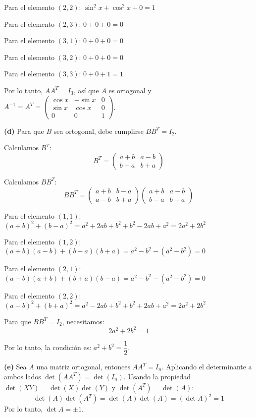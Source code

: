 \begin{myproof}
Para el elemento $(2,2)$: $\sin^2 x + \cos^2 x + 0 = 1$

Para el elemento $(2,3)$: $0 + 0 + 0 = 0$

Para el elemento $(3,1)$: $0 + 0 + 0 = 0$

Para el elemento $(3,2)$: $0 + 0 + 0 = 0$

Para el elemento $(3,3)$: $0 + 0 + 1 = 1$

Por lo tanto, $AA^T = I_3$, así que $A$ es ortogonal y $A^{-1} = A^T = \left(\begin{array}{ccc}\cos x & -\sin x & 0 \\\sin x & \cos x & 0 \\0 & 0 & 1\end{array}\right)$.

\textbf{(d)} Para que $B$ sea ortogonal, debe cumplirse $BB^T = I_2$.

Calculamos $B^T$:
$$B^T = \begin{pmatrix}a+b & a-b \\b-a & b+a\end{pmatrix}$$

Calculamos $BB^T$:
$$BB^T = \begin{pmatrix}a+b & b-a \\a-b & b+a\end{pmatrix} \begin{pmatrix}a+b & a-b \\b-a & b+a\end{pmatrix}$$

Para el elemento $(1,1)$: $(a+b)^2 + (b-a)^2 = a^2 + 2ab + b^2 + b^2 - 2ab + a^2 = 2a^2 + 2b^2$

Para el elemento $(1,2)$: $(a+b)(a-b) + (b-a)(b+a) = a^2 - b^2 - (a^2 - b^2) = 0$

Para el elemento $(2,1)$: $(a-b)(a+b) + (b+a)(b-a) = a^2 - b^2 - (a^2 - b^2) = 0$

Para el elemento $(2,2)$: $(a-b)^2 + (b+a)^2 = a^2 - 2ab + b^2 + b^2 + 2ab + a^2 = 2a^2 + 2b^2$

Para que $BB^T = I_2$, necesitamos:
$$2a^2 + 2b^2 = 1$$

Por lo tanto, la condición es: $a^2 + b^2 = \dfrac{1}{2}$.

\textbf{(e)} Sea $A$ una matriz ortogonal, entonces $AA^T = I_n$. Aplicando el determinante a ambos lados $\det(AA^T) = \det(I_n).$  Usando la propiedad $\det(XY) = \det(X)\det(Y)$ y $\det(A^T) = \det(A)$:
$$\det(A)\det(A^T) = \det(A)\det(A) = (\det A)^2 = 1$$
Por lo tanto, $\det A = \pm 1$.
\end{myproof}
